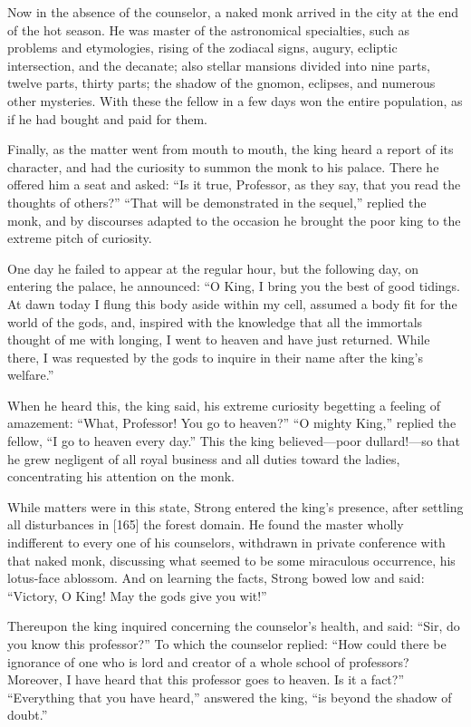\documentclass{article}
\begin{document}
Now in the absence of the counselor, a naked monk arrived in the
city at the end of the hot season. He was master of the
astronomical specialties, such as problems and etymologies, rising
of the zodiacal signs, augury, ecliptic intersection, and the
decanate; also stellar mansions divided into nine parts, twelve
parts, thirty parts; the shadow of the gnomon, eclipses, and
numerous other mysteries. With these the fellow in a few days won
the entire population, as if he had bought and paid for them.

Finally, as the matter went from mouth to mouth, the king heard a
report of its character, and had the curiosity to summon the monk
to his palace. There he offered him a seat and asked:
``Is it true, Professor, as they say, that you read the thoughts of others?''
``That will be demonstrated in the sequel,'' replied the monk, and
by discourses adapted to the occasion he brought the poor king to
the extreme pitch of curiosity.

One day he failed to appear at the regular hour, but the following
day, on entering the palace, he announced:
``O King, I bring you the best of good tidings. At dawn today I flung this body aside within my cell, assumed a body fit for the world of the gods, and, inspired with the knowledge that all the immortals thought of me with longing, I went to heaven and have just returned. While there, I was requested by the gods to inquire in their name after the king's welfare.''

When he heard this, the king said, his extreme curiosity begetting
a feeling of amazement: ``What, Professor! You go to heaven?''
``O mighty King,'' replied the fellow,
``I go to heaven every day.'' This the king believed---poor
dullard!---so that he grew negligent of all royal business and all
duties toward the ladies, concentrating his attention on the monk.

While matters were in this state, Strong entered the king's
presence, after settling all disturbances in [165] the forest
domain. He found the master wholly indifferent to every one of his
counselors, withdrawn in private conference with that naked monk,
discussing what seemed to be some miraculous occurrence, his
lotus-face ablossom. And on learning the facts, Strong bowed low
and said: ``Victory, O King! May the gods give you wit!''

Thereupon the king inquired concerning the counselor's health, and
said: ``Sir, do you know this professor?'' To which the counselor
replied:
``How could there be ignorance of one who is lord and creator of a whole school of professors? Moreover, I have heard that this professor goes to heaven. Is it a fact?''
``Everything that you have heard,'' answered the king,
``is beyond the shadow of doubt.''
\end{document}
